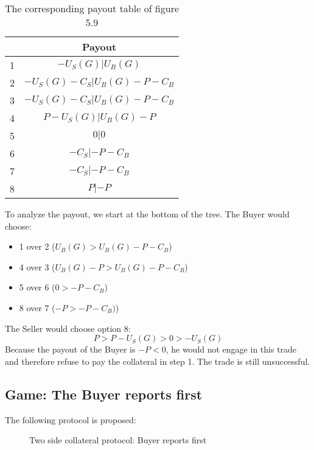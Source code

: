 \documentclass{cacthesis}
\begin{document}
\begin{table}[htb!]
    \centering
    \begin{tabular}{ |c|c| }
    \hline
    & Payout  \\
    \hline
    \hline
    1& $-U_S(G) | U_B(G)$\\
    \hline
    2& $-U_S(G) - C_S| U_B(G)- P - C_B $\\
    \hline
    3&$-U_S(G) - C_S | U_B(G) -P - C_B$ \\
    \hline
    4& $P-U_S(G)| U_B(G)-P$\\
    \hline
    5& $0|0$\\
    \hline 
    6& $-C_S |-P - C_B$\\
    \hline
    7& $-C_S| -P-C_B$\\
    \hline
    8& $P| -P$\\
    \hline
    \end{tabular}
    \caption{The corresponding payout table of figure 5.9}
\end{table}

To analyze the payout, we start at the bottom of the tree. The Buyer would choose:
\begin{itemize}
    \item 1 over 2 ($U_B(G) > U_B(G) -P -C_B$)
    \item 4 over 3 ($U_B(G) - P > U_B(G) -P -C_B$)
    \item 5 over 6 ($0 > -P -C_B$)
    \item 8 over 7 ($-P > -P -C_B)$)
\end{itemize}
The Seller would choose option 8:
\[P>P-U_S(G)>0>-U_S(G)\]
Because the payout of the Buyer is $-P<0$, he would not engage in this trade and therefore refuse to pay the collateral in step 1. The trade is still unsuccessful.

\subsection{Game: The Buyer reports first}
The following protocol is proposed:
\begin{figure}[htb!]
    \centering
    \caption{Two side collateral protocol: Buyer reports first}
    \label{pro:two-side-collateral-buyer-first}
\end{figure}
\end{document}
